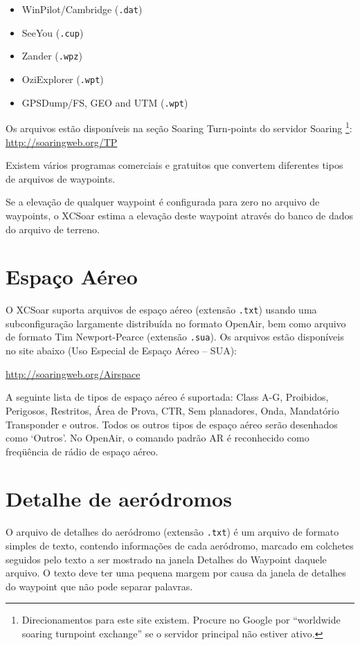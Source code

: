 \begin{itemize}
\item WinPilot/Cambridge (\verb|.dat|)
\item SeeYou (\verb|.cup|)
\item Zander (\verb|.wpz|)
\item OziExplorer (\verb|.wpt|)
\item GPSDump/FS, GEO and UTM (\verb|.wpt|)
\end{itemize}

Os arquivos estão disponíveis na seção Soaring Turn-points do servidor Soaring \footnote{Direcionamentos para este site existem.  Procure no Google por “worldwide soaring turnpoint exchange” se o servidor principal não estiver ativo.}: \url{http://soaringweb.org/TP}

Existem vários programas comerciais e gratuitos que convertem diferentes tipos de arquivos de waypoints.

Se a elevação de qualquer waypoint é configurada para zero no arquivo de waypoints, o XCSoar estima a elevação deste waypoint através do banco de dados do arquivo de terreno.

\section{Espaço Aéreo}

O XCSoar suporta arquivos de espaço aéreo (extensão \verb|.txt|) usando uma subconfiguração largamente distribuída no formato OpenAir, bem como arquivo de formato Tim Newport-Pearce  (extensão \verb|.sua|). Os arquivos estão disponíveis no site abaixo (Uso Especial de Espaço Aéreo – SUA):

\url{http://soaringweb.org/Airspace}

A seguinte lista de tipos de espaço aéreo é suportada: Class A-G, Proibidos, Perigosos, Restritos, Área de Prova, CTR, Sem planadores, Onda, Mandatório Transponder e outros.  Todos os outros tipos de espaço aéreo serão desenhados como ‘Outros’.  No OpenAir, o comando padrão AR é reconhecido como freqüência de rádio de espaço aéreo.

\section{Detalhe de aeródromos}\label{sec:airfield-details}

O arquivo de detalhes do aeródromo (extensão \verb|.txt|) é um arquivo de formato simples de texto, contendo informações de cada aeródromo, marcado em colchetes seguidos pelo texto a ser mostrado na janela Detalhes do Waypoint daquele arquivo.  O texto deve ter uma pequena margem por causa da janela de detalhes do waypoint que não pode separar palavras.


